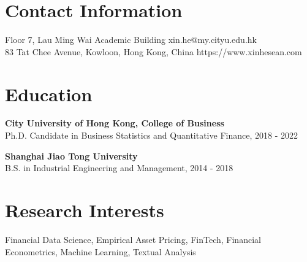 \documentclass[margin]{res}
\begin{document}
\begin{resume}




\section{\sc Contact Information}
	Floor 7, Lau Ming Wai Academic Building	   \hfill xin.he@my.cityu.edu.hk\\        
	83 Tat Chee Avenue, Kowloon, Hong Kong, China 	\hfill   https://www.xinhesean.com \\

\section{\sc Education}
\textbf{City University of Hong Kong, College of Business}\\
{Ph.D. Candidate in Business Statistics and Quantitative Finance, 2018 - 2022}

\textbf{Shanghai Jiao Tong University}\\
{B.S. in Industrial Engineering and Management, 2014 - 2018}

\section{\sc Research Interests}
{Financial Data Science, Empirical Asset Pricing, FinTech, Financial Econometrics, Machine Learning, Textual Analysis}

\vspace{5mm}


\end{resume}
\end{document}
